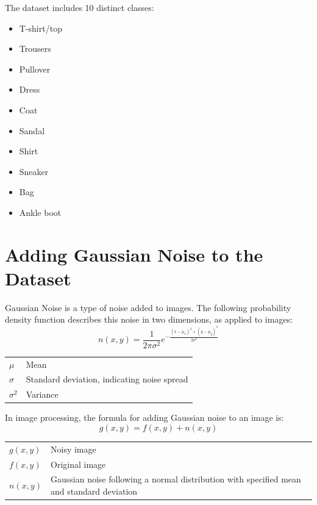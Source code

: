 \documentclass[12pt]{article}
\begin{document}
	The dataset includes 10 distinct classes:
	\begin{itemize}
		\item T-shirt/top
		\item Trousers
		\item Pullover
		\item Dress
		\item Coat
		\item Sandal
		\item Shirt
		\item Sneaker
		\item Bag
		\item Ankle boot
	\end{itemize}	
	\section{Adding Gaussian Noise to the Dataset}
	Gaussian Noise is a type of noise added to images. The following probability density function describes this noise in two dimensions, as applied to images:
	\[ n(x,y) = \frac{1}{2\pi\sigma^2} e^{-\frac{(x-\mu_x)^2 + (y-\mu_y)^2}{2\sigma^2}} \]
		\begin{tabular}{l | l}
			$\mu$ & Mean \\
			$\sigma$ & Standard deviation, indicating noise spread \\
			$\sigma^2$ & Variance \\
		\end{tabular}
	\newpage
	\noindent
	In image processing, the formula for adding Gaussian noise to an image is:
	\[
	g(x,y) = f(x,y) + n(x,y)
	\]
	
		\begin{tabular}{l | l}
			$g(x,y)$ & Noisy image \\
			$f(x,y)$ & Original image \\
			$n(x,y)$ & Gaussian noise following a normal distribution with specified mean and standard deviation \\
		\end{tabular}\\
	
\end{document}
